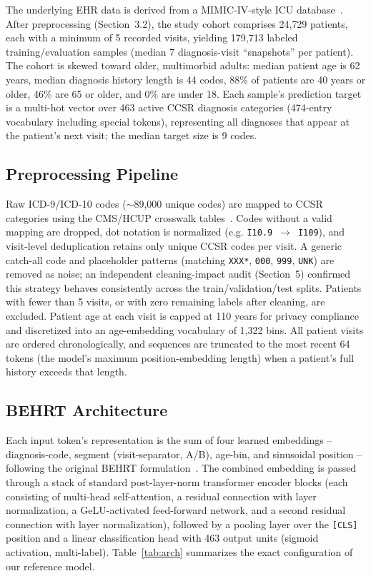 \documentclass[11pt]{article}
\begin{document}
The underlying EHR data is derived from a MIMIC-IV-style ICU
database~\cite{johnson2023mimiciv}. After preprocessing (Section~3.2), the
study cohort comprises 24{,}729 patients, each with a minimum of 5 recorded
visits, yielding 179{,}713 labeled training/evaluation samples (median
7 diagnosis-visit ``snapshots'' per patient). The cohort is skewed toward
older, multimorbid adults: median patient age is 62 years, median diagnosis
history length is 44 codes, 88\% of patients are 40 years or older, 46\% are
65 or older, and 0\% are under 18. Each sample's prediction target is a
multi-hot vector over 463 active CCSR diagnosis categories (474-entry
vocabulary including special tokens), representing all diagnoses that appear
at the patient's next visit; the median target size is 9 codes.

\subsection{Preprocessing Pipeline}

Raw ICD-9/ICD-10 codes ($\sim$89{,}000 unique codes) are mapped to CCSR
categories using the CMS/HCUP crosswalk tables~\cite{hcup2021ccsr}. Codes
without a valid mapping are dropped, dot notation is normalized (e.g.
\texttt{I10.9}~$\to$~\texttt{I109}), and visit-level deduplication retains only
unique CCSR codes per visit. A generic catch-all code and placeholder patterns
(matching \texttt{XXX*}, \texttt{000}, \texttt{999}, \texttt{UNK}) are removed
as noise; an independent cleaning-impact audit (Section~5) confirmed this
strategy behaves consistently across the train/validation/test splits.
Patients with fewer than 5 visits, or with zero remaining labels after
cleaning, are excluded. Patient age at each visit is capped at 110 years for
privacy compliance and discretized into an age-embedding vocabulary of 1{,}322
bins. All patient visits are ordered chronologically, and sequences are
truncated to the most recent 64 tokens (the model's maximum position-embedding
length) when a patient's full history exceeds that length.

\subsection{BEHRT Architecture}

Each input token's representation is the sum of four learned embeddings --
diagnosis-code, segment (visit-separator, A/B), age-bin, and sinusoidal
position -- following the original BEHRT
formulation~\cite{li2020behrt,devlin2019bert}. The combined embedding is passed
through a stack of standard post-layer-norm transformer encoder blocks (each
consisting of multi-head self-attention, a residual connection with layer
normalization, a GeLU-activated feed-forward network, and a second residual
connection with layer normalization), followed by a pooling layer over the
\texttt{[CLS]} position and a linear classification head with 463 output
units (sigmoid activation, multi-label). Table~\ref{tab:arch} summarizes the
exact configuration of our reference model.
\end{document}
